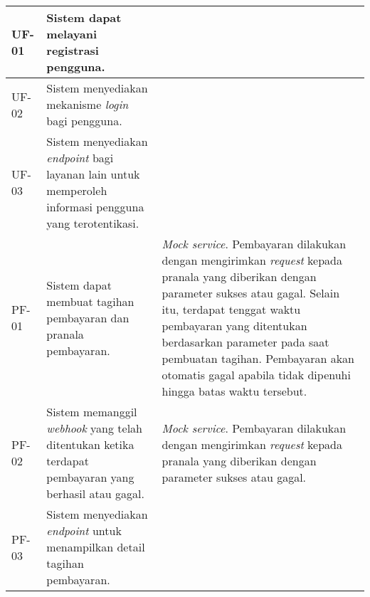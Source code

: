 \begin{longtable}{|l|p{}|p{}|}
    \hline
    \hline
    UF-01       & Sistem dapat melayani registrasi pengguna.                                                                     &                                                                                                                                                                                                                                                                                                                                                       \\
    \hline
    \hline
    UF-02       & Sistem menyediakan mekanisme \textit{login} bagi pengguna.                                                     &                                                                                                                                                                                                                                                                                                                                                       \\
    \hline
    \hline
    UF-03       & Sistem menyediakan \textit{endpoint} bagi layanan lain untuk memperoleh informasi pengguna yang terotentikasi. &                                                                                                                                                                                                                                                                                                                                                       \\
    \hline
    \hline
    PF-01       & Sistem dapat membuat tagihan pembayaran dan pranala pembayaran.                                                & \textit{Mock service}. Pembayaran dilakukan dengan mengirimkan \textit{request} kepada pranala yang diberikan dengan parameter sukses atau gagal. Selain itu, terdapat tenggat waktu pembayaran yang ditentukan berdasarkan parameter pada saat pembuatan tagihan. Pembayaran akan otomatis gagal apabila tidak dipenuhi hingga batas waktu tersebut. \\
    \hline
    \hline
    PF-02       & Sistem memanggil \textit{webhook} yang telah ditentukan ketika terdapat pembayaran yang berhasil atau gagal.   & \textit{Mock service}. Pembayaran dilakukan dengan mengirimkan \textit{request} kepada pranala yang diberikan dengan parameter sukses atau gagal.                                                                                                                                                                                                     \\
    \hline
    \hline
    PF-03       & Sistem menyediakan \textit{endpoint} untuk menampilkan detail tagihan pembayaran.                              &                                                                                                                                                                                                                                                                                                                                                       \\
    \hline
\end{longtable}

